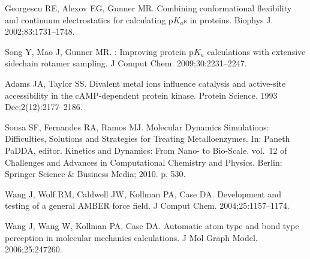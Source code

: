 \documentclass[10pt,letterpaper]{article}
\begin{document}
\begin{thebibliography}{100}
Georgescu RE, Alexov EG, Gunner MR.
\newblock Combining conformational flexibility and continuum electrostatics for
  calculating p$K_a$s in proteins.
\newblock Biophys J. 2002;83:1731--1748.

Song Y, Mao J, Gunner MR.
: Improving protein p$K_a$ calculations with extensive
  sidechain rotamer sampling.
\newblock J Comput Chem. 2009;30:2231--2247.

Adams JA, Taylor SS.
\newblock Divalent metal ions influence catalysis and active-site accessibility
  in the {cAMP}-dependent protein kinase.
\newblock Protein Science. 1993 Dec;2(12):2177--2186.

Sousa SF, Fernandes RA, Ramos MJ.
\newblock Molecular {Dynamics} {Simulations}: {Difficulties}, {Solutions} and
  {Strategies} for {Treating} {Metalloenzymes}.
\newblock In: Paneth PaDDA, editor. Kinetics and {Dynamics}: {From} {Nano}- to
  {Bio}-{Scale}. vol.~12 of Challenges and {Advances} in {Computational}
  {Chemistry} and {Physics}. Berlin: Springer Science \& Business Media; 2010.
  p. 530.

Wang J, Wolf RM, Caldwell JW, Kollman PA, Case DA.
\newblock Development and testing of a general {AMBER} force field.
\newblock J Comput Chem. 2004;25:1157--1174.

Wang J, Wang W, Kollman PA, Case DA.
\newblock Automatic atom type and bond type perception in molecular mechanics
  calculations.
\newblock J Mol Graph Model. 2006;25:247260.

\end{thebibliography}
\end{document}
